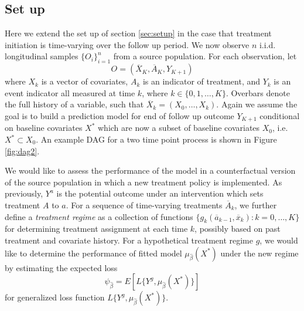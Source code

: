 \subsection{Set up}
Here we extend the set up of section \ref{sec:setup} in the case that treatment initiation is time-varying over the follow up period. We now observe $n$ i.i.d. longitudinal samples $\{O_i\}_{i=1}^n$ from a source population. For each observation, let 
\[O =(\overline{X}_K, \overline{A}_K, Y_{K+1})\]
where $X_k$ is a vector of covariates, $A_k$ is an indicator of treatment, and $Y_k$ is an event indicator all measured at time $k$, where $k \in \{0,1,\ldots, K\}$. Overbars denote the full history of a variable, such that $\overline{X}_k = (X_0,\dots, X_k)$. Again we assume the goal is to build a prediction model for end of follow up outcome $Y_{K+1}$ conditional on baseline covariates $X^*$ which are now a subset of baseline covariates $X_0$, i.e. $X^* \subset X_0$. An example DAG for a two time point process is shown in Figure \ref{fig:dag2}.

We would like to assess the performance of the model in a counterfactual version of the source population in which a new treatment policy is implemented. As previously, $Y^a$ is the potential outcome under an intervention which sets treatment $A$ to $a$. For a sequence of time-varying treatments $\overline{A}_k$, we further define a \textit{treatment regime} as a collection of functions $\{g_k(\overline{a}_{k-1}, \overline{x}_k): k=0,\ldots, K\}$ for determining treatment assignment at each time $k$, possibly based on past treatment and covariate history. For a hypothetical treatment regime $g$, we would like to determine the performance of fitted model $\mu_{\widehat{\beta}}(X^*)$ under the new regime by estimating the expected loss 
$$\psi_{\widehat{\beta}} = E[L\{Y^g, \mu_{\widehat{\beta}}(X^*)\}]$$
for generalized loss function $L\{Y^g, \mu_{\widehat{\beta}}(X^*)\}$.

